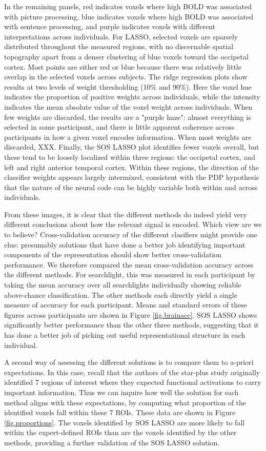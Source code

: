 In the remaining panels, red indicates voxels where high BOLD was associated with picture processing, blue indicates voxels where high BOLD was associated with sentence processing, and purple indicates voxels with different interpretations across individuals. For LASSO, selected voxels are sparsely distributed throughout the measured regions, with no discernable spatial topography apart from a denser clustering of blue voxels toward the occipetal cortex. Most points are either red or blue because there was relatively little overlap in the selected voxels across subjects. The ridge regression plots show results at two levels of weight thresholding (10\% and 90\%). Here the voxel hue indicates the proportion of positive weights across individuals, while the intensity indicates the mean absolute value of the voxel weight across individuals. When few weights are discarded, the results are a "purple haze": almost everything is selected in some participant, and there is little apparent coherence across participants in how a given voxel encodes information. When most weights are discarded, XXX. Finally, the SOS LASSO plot identifies fewer voxels overall, but these tend to be loosely localized within three regions: the occipetal cortex, and left and right anterior temporal cortex. Within these regions, the direction of the classifier weights appears largely intermixed, consistent with the PDP hypothesis that the nature of the neural code can be highly variable both within and across individuals.

From these images, it is clear that the different methods do indeed yield very different conclusions about how the relevant signal is encoded. Which view are we to believe? Cross-validation accuracy of the different clasifiers might provide one clue: presumably solutions that have done a better job identifying important components of the representation should show better cross-validation performance. We therefore compared the mean cross-validation accuracy across the different methods. For searchlight, this was measured in each participant by taking the mean accuracy over all searchlights individually showing reliable above-chance classification. The other methods each directly yield a single measure of accuracy for each participant. Means and standard errors of these figures across participants are shown in Figure \ref{fig.brainacc}. SOS LASSO shows significantly better performance than the other three methods, suggesting that it has done a better job of picking out useful representational structure in each individual.

A second way of assessing the different solutions is to compare them to a-priori expectations. In this case, recall that the authors of the star-plus study originally identified 7 regions of interest where they expected functional activations to carry important information. Thus we can inquire how well the solution for each method aligns with these expectations, by computing what proportion of the identified voxels fall within these 7 ROIs. These data are shown in Figure \ref{fig.proportions}. The voxels identified by SOS LASSO are more likely to fall within the expert-defined ROIs than are the voxels identified by the other methods, providing a further validation of the SOS LASSO solution.



